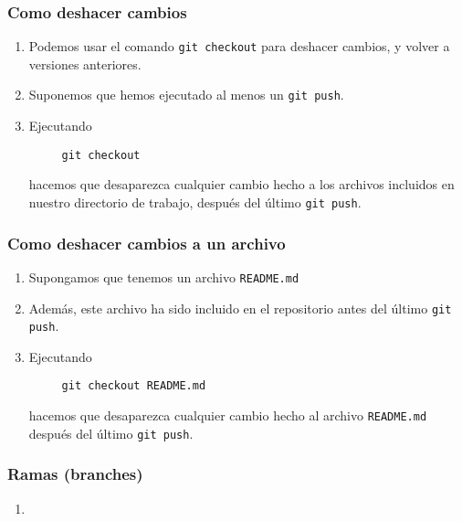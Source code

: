 \documentclass{beamer}
\begin{document}
\begin{frame}[fragile]
\frametitle{Como deshacer cambios}
 
\begin{enumerate}
  \item Podemos usar el comando \verb-git checkout- para deshacer cambios, y volver a versiones anteriores.
  \item Suponemos que hemos ejecutado al menos un \verb-git push-.
  \item Ejecutando
  \begin{verbatim}
     git checkout
  \end{verbatim}
  hacemos que desaparezca cualquier cambio hecho a los archivos 
  incluidos en nuestro directorio de trabajo, después del último \verb-git push-.
\end{enumerate}

\end{frame}

\begin{frame}[fragile]
\frametitle{Como deshacer cambios a un archivo}
 
\begin{enumerate}
  \item Supongamos que tenemos un archivo \verb-README.md-
  \item Además, este archivo ha sido incluido en el repositorio antes del último \verb-git push-.
  \item Ejecutando
  \begin{verbatim}
     git checkout README.md
  \end{verbatim}
  hacemos que desaparezca cualquier cambio hecho al archivo \verb-README.md- 
  después del último \verb-git push-.
\end{enumerate}

\end{frame}

\begin{frame}
	\frametitle{Ramas (branches)}
	
\begin{enumerate}
	\item 
\end{enumerate}
\end{frame}
\end{document}
